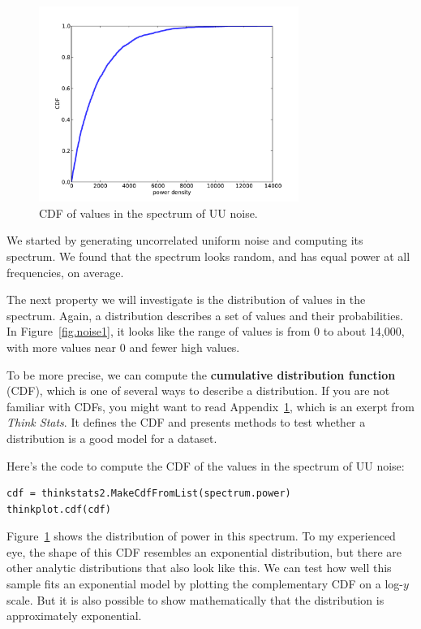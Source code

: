 \documentclass[12pt]{book}
\begin{document}
\section{}

\begin{figure}
\centerline{\includegraphics[height=2.5in]{figs/whitenoise4.pdf}}
\caption{CDF of values in the spectrum of UU noise.}
\label{fig.noise4}
\end{figure}

We started by generating uncorrelated uniform noise and computing
its spectrum.  We found that the spectrum looks random, and has
equal power at all frequencies, on average.

The next property we will investigate is the distribution of values
in the spectrum.  Again, a distribution describes a set of values
and their probabilities.  In Figure~\ref{fig.noise1}, it looks like
the range of values is from 0 to about 14,000, with more values near
0 and fewer high values.

To be more precise, we can compute the {\bf cumulative distribution
  function} (CDF), which is one of several ways to describe a
distribution.  If you are not familiar with CDFs, you might want to
read Appendix~\ref{}, which is an exerpt from {\it Think Stats}.  It
defines the CDF and presents methods to test whether a
distribution is a good model for a dataset.

Here's the code to compute the CDF of the values in the
spectrum of UU noise:

\begin{verbatim}
cdf = thinkstats2.MakeCdfFromList(spectrum.power)
thinkplot.cdf(cdf)
\end{verbatim}

Figure~\ref{fig.noise4} shows the distribution of power in this
spectrum.  To my experienced eye, the shape of this CDF resembles
an exponential distribution, but there are other analytic distributions
that also look like this.  We can test how well this sample fits
an exponential model by plotting the complementary CDF on a 
log-$y$ scale.  But it is also possible to show mathematically that
the distribution is approximately exponential.
\end{document}
